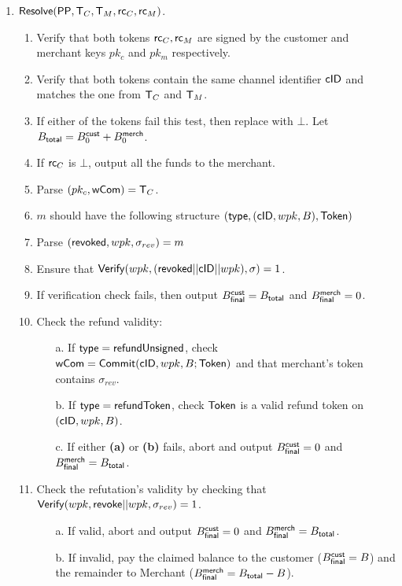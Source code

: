 \documentclass[11pt]{report}
\newcommand{\BC}{B^{\text{\sf cust}}_{\text{0}}}
\newcommand{\BM}{B^{\text{\sf merch}}_{\text{0}}}
\begin{document}
\begin{enumerate}
\item ${\sf Resolve}({\sf PP}, {\sf T}_{C}, {\sf T}_{M}, {\sf rc}_{C}, {\sf rc}_{M})$. 
\begin{enumerate}

\item Verify that both tokens ${\sf rc}_{C}, {\sf rc}_{M}$ are signed by the customer and merchant keys $pk_c$ and $pk_{m}$ respectively. 
\item Verify that both tokens contain the same channel identifier ${\sf cID}$ and matches the one from ${\sf T}_{C}$ and ${\sf T}_{M}$. 
\item If either of the tokens fail this test, then replace with $\bot$. Let $B_{\sf total} = \BC + \BM$. 
\item If ${\sf rc}_{C}$ is $\bot$, output all the funds to the merchant.
\item Parse $(pk_c, {\sf wCom}) = {\sf T}_{C}$.
\item $m$ should have the following structure $({\sf type}, ({\sf cID}, wpk, B), {\sf Token})$
\item Parse $({\sf revoked}, wpk, \sigma_{rev}) = m$
\item Ensure that ${\sf Verify}(wpk, ({\sf revoked}||{\sf cID}||wpk), \sigma) = 1$.
\item If verification check fails, then output ${B_{\sf final}^{\sf cust}} = B_{\sf total}$ and ${B_{\sf final}^{\sf merch}} = 0$.
\item Check the refund validity: 
\begin{enumerate}
\item[a.] If ${\sf type} = {\sf refundUnsigned}$, check ${\sf wCom} = {\sf Commit}({\sf cID}, wpk, B; {\sf Token})$ and that merchant's token contains $\sigma_{rev}$.
\item[b.] If ${\sf type} = {\sf refundToken}$, check ${\sf Token}$ is a valid refund token on $({\sf cID}, wpk, B)$.
\item[c.] If either {\bf (a)} or {\bf (b)} fails, abort and output ${B_{\sf final}^{\sf cust}} = 0$ and ${B_{\sf final}^{\sf merch}} = B_{\sf total}$.
\end{enumerate}
\item Check the refutation's validity by checking that ${\sf Verify}(wpk, {\sf revoke}||wpk, \sigma_{rev}) = 1$.
\begin{enumerate}
\item[a.] If valid, abort and output ${B_{\sf final}^{\sf cust}} = 0$ and ${B_{\sf final}^{\sf merch}} = B_{\sf total}$.
\item[b.] If invalid, pay the claimed balance to the customer (${B_{\sf final}^{\sf cust}} = B$) and the remainder to Merchant (${B_{\sf final}^{\sf merch}} = B_{\sf total} - B$).
\end{enumerate}

\end{enumerate}


\end{enumerate}
\end{document}
